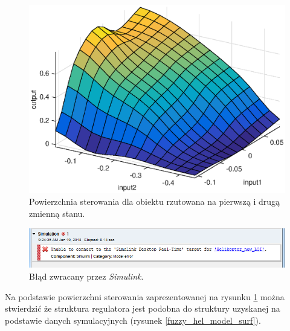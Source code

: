 %
\begin{figure}[h]
	\centering
	\includegraphics[scale = 0.8]{fig/fuzzy_obiekt_surf.eps}
	\caption		
	{Powierzchnia sterowania dla obiektu rzutowana na pierwszą i drugą zmienną stanu.}
	\label{fuzzy_hel_obiekt_surf}
\end{figure} 
\begin{figure}[h]
	\centering
	\includegraphics[scale = 0.8]{fig/bladSim.PNG}
	\caption		
	{Błąd zwracany przez \textit{Simulink}.}
	\label{bladSim}
\end{figure} 
\FloatBarrier
 Na podstawie powierzchni sterowania zaprezentowanej na rysunku \ref{fuzzy_hel_obiekt_surf} można stwierdzić że struktura regulatora jest podobna do struktury uzyskanej na podstawie danych symulacyjnych (rysunek \ref{fuzzy_hel_model_surf}). 
 